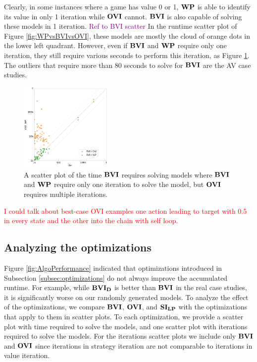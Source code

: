 Clearly, in some instances where a game has value 0 or 1, $\mathbf{WP}$ is able to identify its value in only 1 iteration while $\mathbf{OVI}$ cannot.
$\BVI$ is also capable of solving these models in 1 iteration. \textcolor{purple}{Ref to BVI scatter}
In the runtime scatter plot of Figure \ref{fig:WPvsBVIvsOVI}, these models are mostly the cloud of orange dots in the lower left quadrant.
However, even if $\BVI$ and $\mathbf{WP}$ require only one iteration, they still require various seconds to perform this iteration, as Figure \ref{fig:BVI1IterationTime}.
The outliers that require more than 80 seconds to solve for $\BVI$ are the AV case studies.
\begin{figure}[h!]
    \centering
    \includegraphics[width=0.4\textwidth]{figures/BVI_1_Iteration_vs_OVI.jpg}
    \caption[Time $\BVI$ requires solving models where it only needs one iteration]{
        A scatter plot of the time $\BVI$ requires solving models where $\BVI$ and $\mathbf{WP}$ require only one iteration to solve the model, 
        but $\mathbf{OVI}$ requires multiple iterations. 
    }
    \label{fig:BVI1IterationTime}
\end{figure}
\FloatBarrier

\textcolor{red}{I could talk about best-case OVI examples one action leading to target with 0.5 in every state and the other into the chain with self loop.}

\subsection{Analyzing the optimizations}

Figure \ref{fig:AlgoPerformance} indicated that optimizations introduced in Subsection \ref{subsec:optimizations} do not always improve the accumulated runtime. 
For example, while $\mathbf{BVI_D}$ is better than $\BVI$ in the real case studies, it is significantly worse on our randomly generated models.
To analyze the effect of the optimizations, we compare $\BVI$, $\mathbf{OVI}$, and $\mathbf{SI_{LP}}$ with the optimizations that apply to them in scatter plots.
To each optimization, we provide a scatter plot with time required to solve the models, and one scatter plot with iterations required to solve the models.
For the iterations scatter plots we include only $\BVI$ and $\mathbf{OVI}$ since iterations in strategy iteration are not comparable to iterations in value iteration.

